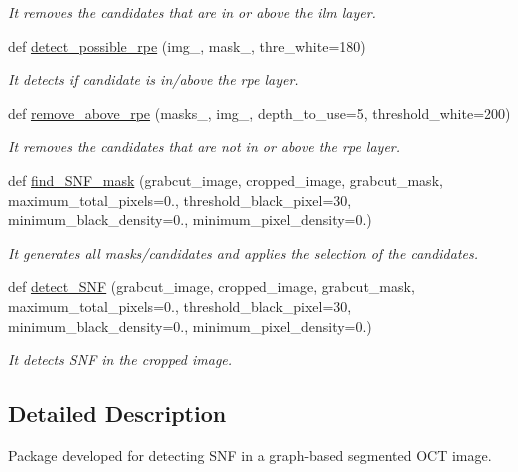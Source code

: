 \begin{DoxyCompactItemize}
\begin{DoxyCompactList}\small\item\em It removes the candidates that are in or above the ilm layer. \end{DoxyCompactList}\item 
def \hyperlink{namespaceDetectionSNF_accb9b9b46aacfb8f4303f291eb307d47}{detect\+\_\+possible\+\_\+rpe} (img\+\_\+, mask\+\_\+, thre\+\_\+white=180)
\begin{DoxyCompactList}\small\item\em It detects if candidate is in/above the rpe layer. \end{DoxyCompactList}\item 
def \hyperlink{namespaceDetectionSNF_ab01ec4b1b8baf5b2621546948f743ec4}{remove\+\_\+above\+\_\+rpe} (masks\+\_\+, img\+\_\+, depth\+\_\+to\+\_\+use=5, threshold\+\_\+white=200)
\begin{DoxyCompactList}\small\item\em It removes the candidates that are not in or above the rpe layer. \end{DoxyCompactList}\item 
def \hyperlink{namespaceDetectionSNF_a7bd369cc27c54e5d12a258baf06c78e2}{find\+\_\+\+S\+N\+F\+\_\+mask} (grabcut\+\_\+image, cropped\+\_\+image, grabcut\+\_\+mask, maximum\+\_\+total\+\_\+pixels=0., threshold\+\_\+black\+\_\+pixel=30, minimum\+\_\+black\+\_\+density=0., minimum\+\_\+pixel\+\_\+density=0.)
\begin{DoxyCompactList}\small\item\em It generates all masks/candidates and applies the selection of the candidates. \end{DoxyCompactList}\item 
def \hyperlink{namespaceDetectionSNF_afeea1ce136ccf0ae9813c46f1c31c680}{detect\+\_\+\+S\+NF} (grabcut\+\_\+image, cropped\+\_\+image, grabcut\+\_\+mask, maximum\+\_\+total\+\_\+pixels=0., threshold\+\_\+black\+\_\+pixel=30, minimum\+\_\+black\+\_\+density=0., minimum\+\_\+pixel\+\_\+density=0.)
\begin{DoxyCompactList}\small\item\em It detects S\+NF in the cropped image. \end{DoxyCompactList}\end{DoxyCompactItemize}


\subsection{Detailed Description}
Package developed for detecting S\+NF in a graph-\/based segmented O\+CT image. 

